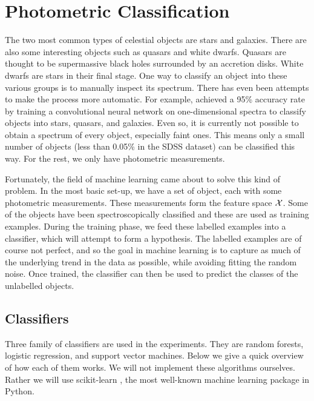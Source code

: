 

\chapter{Photometric Classification}
\label{cha:ml}

The two most common types of celestial objects are stars and galaxies. There are also some
interesting objects such as quasars and white dwarfs. Quasars are thought to be supermassive black holes surrounded by an accretion disks.
White dwarfs are stars in their final stage. One way to classify an object into 
these various groups is to manually inspect its spectrum.
There has even been attempts to make the process
more automatic. For example,  achieved a 95\% accuracy rate by training
a convolutional neural network on one-dimensional spectra to classify objects
into stars, quasars, and galaxies. Even so, it is currently not possible to obtain
a spectrum of every object, especially faint ones. This means only a small number of objects
(less than 0.05\% in the SDSS dataset) can be classified this way. For the rest,
we only have photometric measurements.

Fortunately, the field of machine learning came about to solve this kind of problem.
In the most basic set-up, we have a set of object, each with some photometric measurements.
These measurements form the feature space $\mathcal{X}$.
Some of the objects have been spectroscopically classified and these are used as training
examples. During the training phase, we feed these labelled examples into a classifier,
which will attempt to form a hypothesis. The labelled examples are of course not perfect, and so
the goal in machine learning is to capture as much of the underlying trend in the data as possible,
while avoiding fitting the random noise. Once trained, the classifier can then
be used to predict the classes of the unlabelled objects.

\section{Classifiers}
\label{sec:machine}
Three family of classifiers are used in the experiments. They are random forests,
logistic regression, and support vector machines. Below we give a quick overview of how
each of them works. We will not implement these algorithms ourselves. Rather we will use
scikit-learn \cite{pedregosa11}, the most well-known machine learning package
in Python. 

